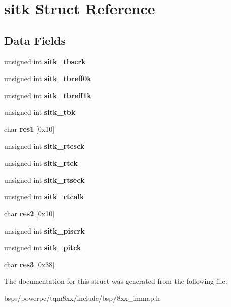 \hypertarget{structsitk}{}\section{sitk Struct Reference}
\label{structsitk}
\subsection*{Data Fields}
\begin{DoxyCompactItemize}
\item 
\mbox{\label{structsitk_afe91d44ea0d433a09c4e3056c8b96495}} 
unsigned int {\bfseries sitk\+\_\+tbscrk}
\item 
\mbox{\label{structsitk_ad889f182818c068b91900d634be3f039}} 
unsigned int {\bfseries sitk\+\_\+tbreff0k}
\item 
\mbox{\label{structsitk_a656950f906926eef8417ad1cfb106b9e}} 
unsigned int {\bfseries sitk\+\_\+tbreff1k}
\item 
\mbox{\label{structsitk_a2604b642753ee6d7d4f555c38e4f0b08}} 
unsigned int {\bfseries sitk\+\_\+tbk}
\item 
\mbox{\label{structsitk_aa3f3d093cfcabe0d9944fbf0070d51c6}} 
char {\bfseries res1} \mbox{[}0x10\mbox{]}
\item 
\mbox{\label{structsitk_a8d61310f7f515c204f02e365ac0db7e0}} 
unsigned int {\bfseries sitk\+\_\+rtcsck}
\item 
\mbox{\label{structsitk_a64647b4155b0c172927800675eaf7e91}} 
unsigned int {\bfseries sitk\+\_\+rtck}
\item 
\mbox{\label{structsitk_aac836b4df18a2c2a037c32fd198056fb}} 
unsigned int {\bfseries sitk\+\_\+rtseck}
\item 
\mbox{\label{structsitk_aa355d84b5441ac24b076e563af05e0ae}} 
unsigned int {\bfseries sitk\+\_\+rtcalk}
\item 
\mbox{\label{structsitk_ac64bb45f68f494bd300faee5e10eccf4}} 
char {\bfseries res2} \mbox{[}0x10\mbox{]}
\item 
\mbox{\label{structsitk_a47d942541cf5a9675da4a8982f8fc659}} 
unsigned int {\bfseries sitk\+\_\+piscrk}
\item 
\mbox{\label{structsitk_a871345e675ca16ea2a76cd1252b6ba29}} 
unsigned int {\bfseries sitk\+\_\+pitck}
\item 
\mbox{\label{structsitk_a28d9aa9a0a4a41058bbc9cfcc6dd63be}} 
char {\bfseries res3} \mbox{[}0x38\mbox{]}
\end{DoxyCompactItemize}


The documentation for this struct was generated from the following file\+:\begin{DoxyCompactItemize}
\item 
bsps/powerpc/tqm8xx/include/bsp/8xx\+\_\+immap.\+h\end{DoxyCompactItemize}
